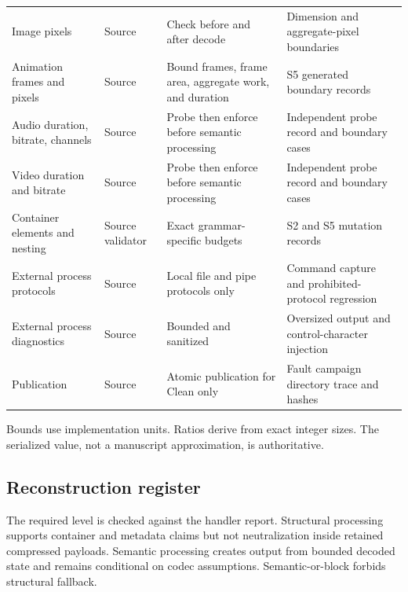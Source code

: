 \begin{longtable}{L{0.20\textwidth}L{0.14\textwidth}L{0.23\textwidth}L{0.24\textwidth}}
Image pixels & Source & Check before and after decode & Dimension and aggregate-pixel boundaries \\
Animation frames and pixels & Source & Bound frames, frame area, aggregate work, and duration & S5 generated boundary records \\
Audio duration, bitrate, channels & Source & Probe then enforce before semantic processing & Independent probe record and boundary cases \\
Video duration and bitrate & Source & Probe then enforce before semantic processing & Independent probe record and boundary cases \\
Container elements and nesting & Source validator & Exact grammar-specific budgets & S2 and S5 mutation records \\
External process protocols & Source & Local file and pipe protocols only & Command capture and prohibited-protocol regression \\
External process diagnostics & Source & Bounded and sanitized & Oversized output and control-character injection \\
Publication & Source & Atomic publication for Clean only & Fault campaign directory trace and hashes \\
\bottomrule
\end{longtable}
\endgroup

Bounds use implementation units. Ratios derive from exact integer sizes. The
serialized value, not a manuscript approximation, is authoritative.

\subsection{Reconstruction register}
\label{subsec:reconstruction-register}

The required level is checked against the handler report. Structural processing
supports container and metadata claims but not neutralization inside retained
compressed payloads. Semantic processing creates output from bounded decoded
state and remains conditional on codec assumptions. Semantic-or-block forbids
structural fallback.

